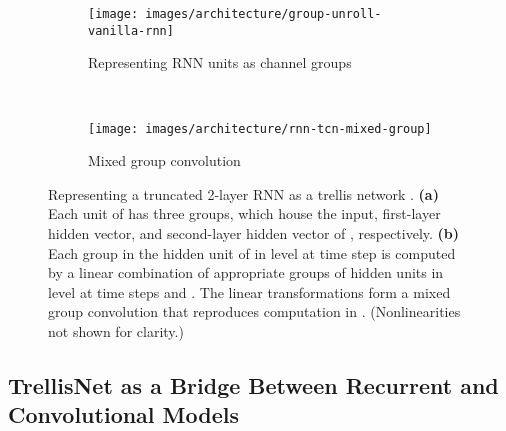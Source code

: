 \documentclass{article} \usepackage{iclr2019_conference,times}
\begin{document}
\begin{figure}[t]
    \vspace{-.4in}
    \centering
    \begin{subfigure}[b]{.49\textwidth}
        \centering
        \texttt{[image: images/architecture/group-unroll-vanilla-rnn]}
        \vspace{-.23in}
        \caption{Representing RNN units as channel groups}
        \label{fig:unrolled-RNN-groups}
    \end{subfigure}
    ~
    \begin{subfigure}[b]{.42\textwidth}
        \centering
        \texttt{[image: images/architecture/rnn-tcn-mixed-group]}
        \vspace{-.21in}
        \caption{Mixed group convolution}
        \label{fig:rnn-tcn-mixed-group}
    \end{subfigure}
    \vspace{-1.5mm}
    \caption{Representing a truncated 2-layer RNN  as a trellis network . {\bf (a)} Each unit of  has three groups, which house the input, first-layer hidden vector, and second-layer hidden vector of , respectively. {\bf (b)} Each group in the hidden unit of  in level  at time step  is computed by a linear combination of appropriate groups of hidden units in level  at time steps  and . The linear transformations form a mixed group convolution that reproduces computation in . (Nonlinearities not shown for clarity.)}
    \vspace{-5mm}
\end{figure}


\subsection{TrellisNet as a Bridge Between Recurrent and Convolutional Models}
\label{subsec:optimize-trellis}
\end{document}
